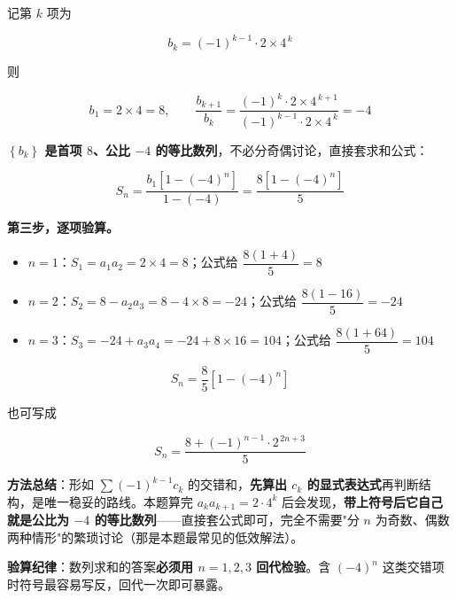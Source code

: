 \begin{answer}
记第 $k$ 项为

\nopagebreak[4]
\[b_k=(-1)^{k-1}\cdot2\times4^{\,k}\]

则

\nopagebreak[4]
\[b_1=2\times4=8,\qquad \frac{b_{k+1}}{b_k}=\frac{(-1)^{k}\cdot2\times4^{\,k+1}}{(-1)^{k-1}\cdot2\times4^{\,k}}=-4\]

\textbf{$\left\{b_k\right\}$ 是首项 $8$、公比 $-4$ 的等比数列}，不必分奇偶讨论，直接套求和公式：

\nopagebreak[4]
\[S_n=\frac{b_1\left[1-(-4)^{n}\right]}{1-(-4)}=\frac{8\left[1-(-4)^{n}\right]}5\]

\textbf{第三步，逐项验算。}

\begin{itemize}
\item $n=1$：$S_1=a_1a_2=2\times4=8$；公式给 $\dfrac{8(1+4)}5=8$ 
\item $n=2$：$S_2=8-a_2a_3=8-4\times8=-24$；公式给 $\dfrac{8(1-16)}5=-24$ 
\item $n=3$：$S_3=-24+a_3a_4=-24+8\times16=104$；公式给 $\dfrac{8(1+64)}5=104$ 
\end{itemize}

\nopagebreak[4]
\[\boxed{S_n=\frac85\left[1-(-4)^{n}\right]}\]

也可写成

\nopagebreak[4]
\[S_n=\frac{8+(-1)^{n-1}\cdot2^{\,2n+3}}5\]

\begin{gktip}
\textbf{方法总结}：形如 $\sum(-1)^{k-1}c_k$ 的交错和，\textbf{先算出 $c_k$ 的显式表达式}再判断结构，是唯一稳妥的路线。本题算完 $a_ka_{k+1}=2\cdot4^{k}$ 后会发现，\textbf{带上符号后它自己就是公比为 $-4$ 的等比数列}——直接套公式即可，完全不需要"分 $n$ 为奇数、偶数两种情形"的繁琐讨论（那是本题最常见的低效解法）。

\textbf{验算纪律}：数列求和的答案\textbf{必须用 $n=1,2,3$ 回代检验}。含 $(-4)^{n}$ 这类交错项时符号最容易写反，回代一次即可暴露。
\end{gktip}



\par\medskip

\end{answer}
